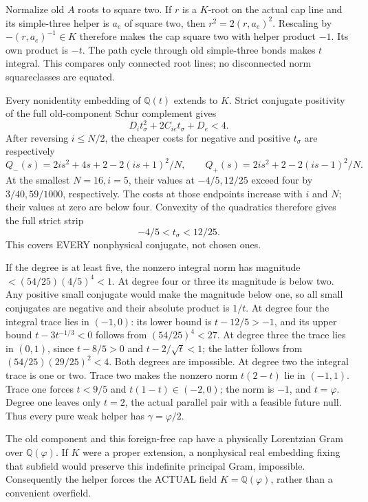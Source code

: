 Normalize old \(A\) roots to square two.
If \(r\) is a \(K\)-root on the actual cap line and its simple-three
helper is \(a_e\) of square two, then
\(r^2=2(r,a_e)^2\).  Rescaling by \(-(r,a_e)^{-1}\in K\)
therefore makes the cap square two with helper product \(-1\).
Its own product is \(-t\).
The path cycle through old simple-three bonds makes \(t\) integral.
This compares only connected root lines; no disconnected norm
squareclasses are equated.

Every nonidentity embedding of \(\mathbb Q(t)\) extends to \(K\).
Strict conjugate positivity of the full old-component Schur
complement gives
\[
                    D_it_\sigma^2+2C_{ie}t_\sigma+D_e<4 .
\]
After reversing \(i\le N/2\), the cheaper costs for negative and
positive \(t_\sigma\) are respectively
\[
 Q_-(s)=2is^2+4s+2-2(is+1)^2/N,\qquad
 Q_+(s)=2is^2+2-2(is-1)^2/N .
\]
At the smallest \(N=16,i=5\), their values at \(-4/5,12/25\)
exceed four by \(3/40,59/1000\), respectively.
The costs at those endpoints increase with \(i\) and \(N\);
their values at zero are below four.
Convexity of the quadratics therefore gives the full strict strip
\[
                         -4/5<t_\sigma<12/25 .
\tag{Agoldenstrip}\label{eq:arithAgoldenstrip}
\]
This covers EVERY nonphysical conjugate, not chosen ones.

If the degree is at least five, the nonzero integral norm has
magnitude \(<(54/25)(4/5)^4<1\).
At degree four or three its magnitude is below two.
Any positive small conjugate would make the magnitude below one,
so all small conjugates are negative and their absolute product
is \(1/t\).
At degree four the integral trace lies in \((-1,0)\):
its lower bound is \(t-12/5>-1\), and its upper bound
\(t-3t^{-1/3}<0\) follows from \((54/25)^4<27\).
At degree three the trace lies in \((0,1)\), since
\(t-8/5>0\) and \(t-2/\sqrt t<1\);
the latter follows from
\((54/25)(29/25)^2<4\).
Both degrees are impossible.
At degree two the integral trace is one or two.
Trace two makes the nonzero norm \(t(2-t)\) lie in \((-1,1)\).
Trace one forces \(t<9/5\) and \(t(1-t)\in(-2,0)\);
the norm is \(-1\), and \(t=\varphi\).
Degree one leaves only \(t=2\), the actual parallel pair with
a feasible future null.
Thus every pure weak helper has \(\gamma=\varphi/2\).

The old component and this foreign-free cap have a physically
Lorentzian Gram over \(\mathbb Q(\varphi)\).
If \(K\) were a proper extension, a nonphysical real embedding
fixing that subfield would preserve this indefinite principal
Gram, impossible.
Consequently the helper forces the ACTUAL field
\(K=\mathbb Q(\varphi)\), rather than a convenient overfield.

